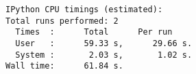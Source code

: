 \begin{Code}[scale=0.75,htbp!]
    \centering
\begin{lstlisting}[caption=Timing of a typical run of the code,
label=listing:time]
IPython CPU timings (estimated):
Total runs performed: 2
  Times  :      Total      Per run
  User   :      59.33 s,      29.66 s.
  System :       2.03 s,       1.02 s.
Wall time:      61.84 s.
\end{lstlisting}
\end{Code}














%
%
%
